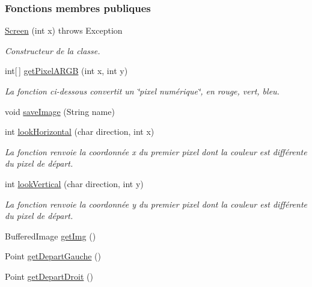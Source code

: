 \subsubsection*{Fonctions membres publiques}
\begin{DoxyCompactItemize}
\item 
\hyperlink{classTestSushi_1_1src_1_1Suchi_1_1Screen_a9add1c7c72beeedb43c8cc83eba5d516}{Screen} (int x)  throws Exception 
\begin{DoxyCompactList}\small\item\em Constructeur de la classe. \end{DoxyCompactList}\item 
int\mbox{[}$\,$\mbox{]} \hyperlink{classTestSushi_1_1src_1_1Suchi_1_1Screen_a164d2e2e7e8842d22d572616e6e42d91}{get\+Pixel\+A\+R\+G\+B} (int x, int y)
\begin{DoxyCompactList}\small\item\em La fonction ci-\/dessous convertit un \char`\"{}pixel numérique\char`\"{}, en rouge, vert, bleu. \end{DoxyCompactList}\item 
void \hyperlink{classTestSushi_1_1src_1_1Suchi_1_1Screen_a2f02af516d37131e6caa17a462207db9}{save\+Image} (String name)
\item 
int \hyperlink{classTestSushi_1_1src_1_1Suchi_1_1Screen_a445a671d42d437061e770ab5d5c90a29}{look\+Horizontal} (char direction, int x)
\begin{DoxyCompactList}\small\item\em La fonction renvoie la coordonnée x du premier pixel dont la couleur est différente du pixel de départ. \end{DoxyCompactList}\item 
int \hyperlink{classTestSushi_1_1src_1_1Suchi_1_1Screen_a6d27b9186f8ac7e718f0bd274e12a922}{look\+Vertical} (char direction, int y)
\begin{DoxyCompactList}\small\item\em La fonction renvoie la coordonnée y du premier pixel dont la couleur est différente du pixel de départ. \end{DoxyCompactList}\item 
Buffered\+Image \hyperlink{classTestSushi_1_1src_1_1Suchi_1_1Screen_abda2cf938d0c53cd814c5b82d9dac733}{get\+Img} ()
\item 
Point \hyperlink{classTestSushi_1_1src_1_1Suchi_1_1Screen_a6fe2cc2e13013b44d3f9c2933d9a6910}{get\+Depart\+Gauche} ()
\item 
Point \hyperlink{classTestSushi_1_1src_1_1Suchi_1_1Screen_a7ffc5bc670a9c0660beecbaf181dd93f}{get\+Depart\+Droit} ()

\end{DoxyCompactItemize}
